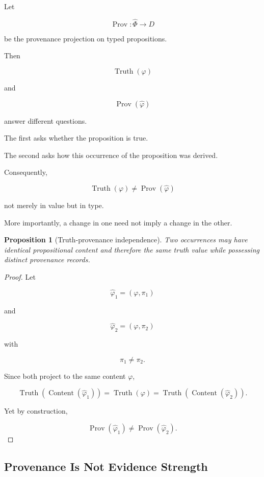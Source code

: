 \documentclass[
  11pt,
  a4paper,
  DIV=12,
  BCOR=0mm,
  parskip=half-
]{scrartcl}
\newcommand{\Truth}{\operatorname{Truth}}
\newcommand{\Prov}{\operatorname{Prov}}
\newcommand{\Content}{\operatorname{Content}}
\theoremstyle{definition}
\theoremstyle{plain}
\newtheorem{proposition}[definition]{Proposition}
\theoremstyle{remark}
\begin{document}
Let

\[
  \Prov:\widehat\Phi\to D
\]

be the provenance projection on typed propositions.

Then

\[
  \Truth(\varphi)
\]

and

\[
  \Prov(\widehat\varphi)
\]

answer different questions.

The first asks whether the proposition is true.

The second asks how this occurrence of the proposition was derived.

Consequently,

\[
  \Truth(\varphi)
  \neq
  \Prov(\widehat\varphi)
\]

not merely in value but in type.

More importantly, a change in one need not imply a change in the other.

\begin{proposition}[Truth-provenance independence]
\label{prop:truth-provenance-independence}
Two occurrences may have identical propositional content and therefore the
same truth value while possessing distinct provenance records.
\end{proposition}

\begin{proof}
Let

\[
  \widehat\varphi_1
  =
  (\varphi,\pi_1)
\]

and

\[
  \widehat\varphi_2
  =
  (\varphi,\pi_2)
\]

with

\[
  \pi_1\neq\pi_2.
\]

Since both project to the same content \(\varphi\),

\[
  \Truth(\Content(\widehat\varphi_1))
  =
  \Truth(\varphi)
  =
  \Truth(\Content(\widehat\varphi_2)).
\]

Yet by construction,

\[
  \Prov(\widehat\varphi_1)
  \neq
  \Prov(\widehat\varphi_2).
\]
\end{proof}


\subsection{Provenance Is Not Evidence Strength}
\label{app:provenance-evidence}
\end{document}
